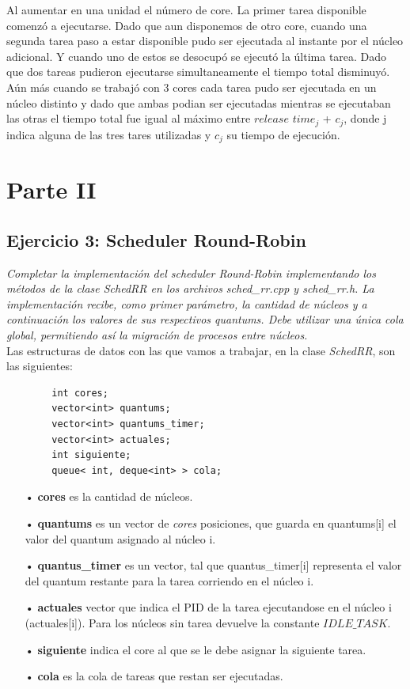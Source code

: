 \documentclass[a4paper]{article}
\begin{document}
Al aumentar en una unidad el número de core. La primer tarea disponible comenzó a ejecutarse. Dado que aun disponemos de otro core, cuando una segunda tarea paso a estar disponible pudo ser ejecutada al instante por el núcleo adicional. Y cuando uno de estos se desocupó se ejecutó la última tarea. Dado que dos tareas pudieron ejecutarse simultaneamente el tiempo total disminuyó. Aún más cuando se trabajó con 3 cores cada tarea pudo ser ejecutada en un núcleo distinto y dado que ambas podian ser ejecutadas mientras se ejecutaban las otras el tiempo total fue igual al máximo entre $release$ $time_j$ + $c_j$, donde j indica alguna de las tres tares utilizadas y $c_j$ su tiempo de ejecución.   
\newpage

\section{Parte II}


\subsection{Ejercicio 3: Scheduler Round-Robin}

\textit{Completar la implementaci\'on del scheduler Round-Robin implementando los m\'etodos de la clase SchedRR en los archivos sched_rr.cpp y sched_rr.h. La implementaci\'on recibe, como primer par\'ametro, la cantidad de n\'ucleos y a continuaci\'on los valores de sus respectivos quantums. Debe utilizar una \'unica cola global, permitiendo as\'i la migraci\'on de procesos entre n\'ucleos.}\\


Las estructuras de datos con las que vamos a trabajar, en la clase \emph{SchedRR}, son las siguientes:
	\begin{codesnippet}
	\begin{verbatim}
		int cores;
		vector<int> quantums;
		vector<int> quantums_timer;
		vector<int> actuales;
		int siguiente;
		queue< int, deque<int> > cola;
	\end{verbatim}
	\end{codesnippet}
	
	\begin{itemize}
	\item[•]\textbf{cores} es la cantidad de n\'ucleos.
	\item[•]\textbf{quantums} es un vector de \textit{cores} posiciones, que guarda en quantums[i] el valor del quantum asignado al n\'ucleo i.
	\item[•]\textbf{quantus_timer} es un vector, tal que quantus_timer[i] representa el valor del quantum restante para la tarea corriendo en el n\'ucleo i.
	\item[•]\textbf{actuales} vector que indica el PID de la tarea ejecutandose en el núcleo i (actuales[i]). Para los núcleos sin tarea devuelve la constante $IDLE\_TASK$.
	\item[•]\textbf{siguiente} indica el core al que se le debe asignar la siguiente tarea.
	\item[•]\textbf{cola} es la cola de tareas que restan ser ejecutadas.
	\end{itemize}	
	
\end{document}
